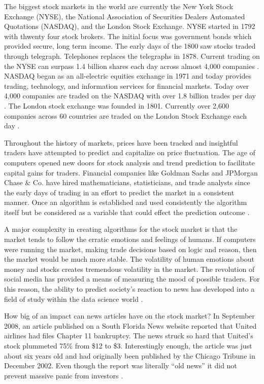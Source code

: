 \documentclass[sigconf]{acmart}
\begin{document}
The biggest stock markets in the world are currently the New York Stock Exchange (NYSE), the National Association of Securities Dealers Automated Quotations (NASDAQ), and the London Stock Exchange. NYSE started in 1792 with thwenty four stock brokers. The initial focus was government bonds which provided secure, long term income. The early days of the 1800 saw stocks traded through telegraph. Telephones replaces the telegraphs in 1878. Current trading on the NYSE can surpass 1.4 billion shares each day across almost 4,000 companies \cite{www-nyse}. NASDAQ began as an all-electric equities exchange in 1971 and today provides trading, technology, and information services for financial markets. Today over 4,000 companies are traded on the NASDAQ with over 1.8 billion trades per day \cite{www-nasdaq}. The London stock exchange was founded in 1801. Currently over 2,600 companies across 60 countries are traded on the London Stock Exchange each day \cite{www-lse}.

Throughout the history of markets, prices have been tracked and insightful traders have attempted to predict and capitalize on price fluctuation. The age of computers opened new doors for stock analysis and trend prediction to facilitate capital gains for traders. Financial companies like Goldman Sachs and JPMorgan Chase \& Co. have hired mathematicians, statisticians, and trade analysts since the early days of trading in an effort to predict the market in a consistent manner. Once an algorithm is established and used consistently the algorithm itself but be considered as a variable that could effect the prediction outcome \cite{Hellstrom}. 

A major complexity in creating algorithms for the stock market is that the market tends to follow the erratic emotions and feelings of humans. If computers were running the market, making trade decisions based on logic and reason, then the market would be much more stable. The volatility of human emotions about money and stocks creates tremendous volatility in the market. The revolution of social media has provided a means of measuring the mood of possible traders. For this reason, the ability to predict society's reaction to news has developed into a field of study within the data science world \cite{BOLLEN}. 

How big of an impact can news articles have on the stock market? In September 2008, an article published on a South Florida News website reported that United airlines had files Chapter 11 bankruptcy. The news struck so hard that United's stock plummeted 75\% from \$12 to \$3. Interestingly enough, the article was just about six years old and had originally been published by the Chicago Tribune in December 2002. Even though the report was literally ``old news'' it did not prevent massive panic from investors \cite{www-chTrib}.
\end{document}
